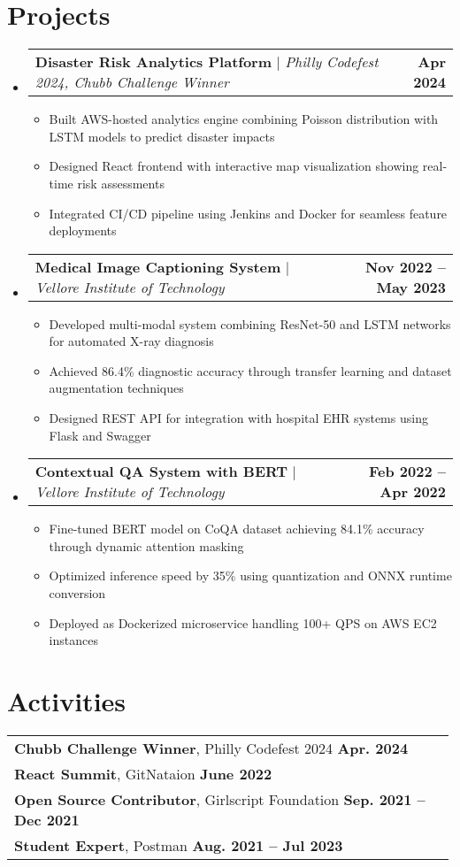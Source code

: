 \documentclass[letterpaper,11pt]{article}
\makeatletter
\newcommand{\resumeItem}[1]{
  \item\small{
    {#1 \vspace{-2pt}}
  }
}
\newcommand{\resumeProjectHeading}[2]{
    \item
    \begin{tabular*}{1.001\textwidth}{l@{\extracolsep{\fill}}r}
      \small#1 & \textbf{\small #2}\\
    \end{tabular*}\vspace{-3pt}
}
\newcommand{\resumeSubHeadingListStart}{\begin{itemize}[leftmargin=0.0in, label={}]}
\newcommand{\resumeSubHeadingListEnd}{\end{itemize}}
\newcommand{\resumeItemListStart}{\begin{itemize}}
\newcommand{\resumeItemListEnd}{\end{itemize}\vspace{-5pt}}
\makeatother
\begin{document}
\section{Projects}
\vspace{-5pt}
\resumeSubHeadingListStart
    \resumeProjectHeading
    {\textbf{Disaster Risk Analytics Platform} $|$ \emph{Philly Codefest 2024, Chubb Challenge Winner}} {Apr 2024}
    \resumeItemListStart
        \resumeItem{Built AWS-hosted analytics engine combining Poisson distribution with LSTM models to predict disaster impacts}
        \resumeItem{Designed React frontend with interactive map visualization showing real-time risk assessments}
        \resumeItem{Integrated CI/CD pipeline using Jenkins and Docker for seamless feature deployments}
    \resumeItemListEnd
    
    \resumeProjectHeading
    {\textbf{Medical Image Captioning System} $|$ \emph{Vellore Institute of Technology}} {Nov 2022 -- May 2023}
    \resumeItemListStart
        \resumeItem{Developed multi-modal system combining ResNet-50 and LSTM networks for automated X-ray diagnosis}
        \resumeItem{Achieved 86.4\% diagnostic accuracy through transfer learning and dataset augmentation techniques}
        \resumeItem{Designed REST API for integration with hospital EHR systems using Flask and Swagger}
    \resumeItemListEnd
    
    \resumeProjectHeading
    {\textbf{Contextual QA System with BERT} $|$ \emph{Vellore Institute of Technology}} {Feb 2022 -- Apr 2022}
    \resumeItemListStart
        \resumeItem{Fine-tuned BERT model on CoQA dataset achieving 84.1\% accuracy through dynamic attention masking}
        \resumeItem{Optimized inference speed by 35\% using quantization and ONNX runtime conversion}
        \resumeItem{Deployed as Dockerized microservice handling 100+ QPS on AWS EC2 instances}
    \resumeItemListEnd
\resumeSubHeadingListEnd

\section{Activities}
\begin{tabular}{p{0.99\linewidth}}
    \hspace{0.15in}\textbf{Chubb Challenge Winner}, Philly Codefest 2024
        \hfill \textbf{Apr. 2024} \\
            \hspace{0.15in}\textbf{React Summit}, GitNataion
        \hfill \textbf{June 2022}\\
    \hspace{0.15in}\textbf{Open Source Contributor}, Girlscript Foundation
        \hfill \textbf{Sep. 2021 -- Dec 2021}\\

    \hspace{0.15in}\textbf{Student Expert}, Postman
        \hfill \textbf{Aug. 2021 -- Jul 2023} 
    
\end{tabular}
\vspace{-15pt}
\end{document}
